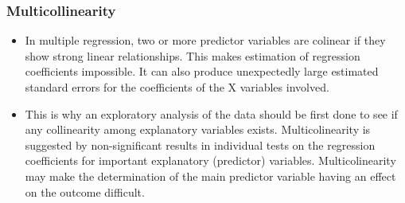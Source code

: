 \begin{frame}
\frametitle{Multicollinearity}
\begin{itemize}
\item In multiple regression, two or more predictor variables are colinear if they show strong linear relationships. This makes estimation of regression coefficients impossible. It can also produce unexpectedly large estimated standard errors for the coefficients of the X variables involved.
\item This is why an exploratory analysis of the data should be first done to see if any collinearity among explanatory variables exists. Multicolinearity is suggested by non-significant results in individual tests on the regression coefficients for important explanatory (predictor) variables. Multicolinearity may make the determination of the main predictor variable having an effect on the outcome difficult.
\end{itemize}
\end{frame}


